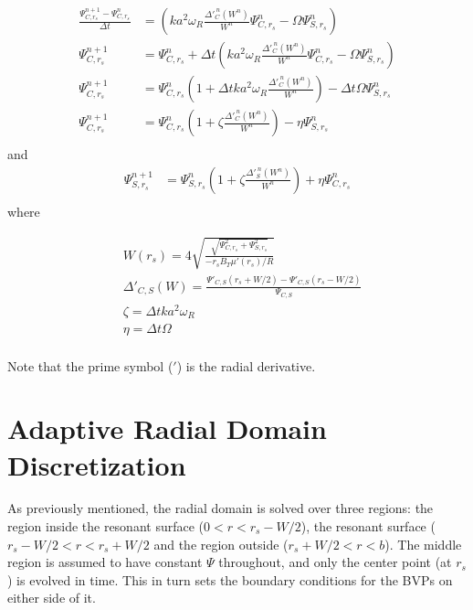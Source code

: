 \documentclass{article}
\begin{document}
\begin{equation} \label{eq3}
\begin{split}
\frac{\Psi_{C,r_s}^{n+1}-\Psi_{C,r_s}^{n}}{\Delta t} &=\left( k a^2 \omega_R \frac{\Delta'^{\ n}_{C}(W^n)}{W^n}\Psi_{C,r_s}^n-\Omega \Psi_{S,r_s}^n  \right ) \\
\Psi_{C,r_s}^{n+1} &=\Psi_{C,r_s}^{n}+\Delta t \left( k a^2 \omega_R \frac{\Delta'^{\ n}_C(W^{n})}{W^{n}}\Psi_{C,r_s}^{n}-\Omega \Psi_{S,r_s}^{n} \right )  \\ 
\Psi_{C,r_s}^{n+1} &=\Psi_{C,r_s}^{n}\left( 1 + \Delta t  k a^2 \omega_R \frac{\Delta'^{\ n}_C(W^{n})}{W^{n}}\right) - \Delta t \Omega \Psi_{S,r_s}^{n}   \\
\Psi_{C,r_s}^{n+1} &=\Psi_{C,r_s}^{n}\left( 1 + \zeta \frac{\Delta'^{\ n}_C(W^{n})}{W^{n}}\right) - \eta \Psi_{S,r_s}^{n}   \\
\end{split} 
\end{equation} 
and
\begin{equation} \label{eq3}
\begin{split}
\Psi_{S,r_s}^{n+1} &=\Psi_{S,r_s}^{n}\left( 1 + \zeta \frac{\Delta'^{\ n}_S(W^{n})}{W^{n}}\right) + \eta \Psi_{C,r_s}^{n}   \\
\end{split} 
\end{equation} 
where



\begin{equation} \label{eq3}
\begin{split}
 & W(r_s) = 4 \sqrt{\frac{\sqrt{\Psi^2_{C,r_s} + \Psi^2_{S,r_s}}}{-r_sB_T\mu'(r_s)/R} }\\
  & \Delta'_{C,S}(W)=\frac{\Psi'_{C,S}(r_s+W/2)-\Psi'_{C,S}(r_s-W/2)}{\Psi_{C,S}} \\
  & \zeta = \Delta t k a^2 \omega_R \\
  & \eta =  \Delta t \Omega \\
\end{split} 
\end{equation} 

Note that the prime symbol ($'$) is the radial derivative.  


\section{Adaptive Radial Domain Discretization}
As previously mentioned, the radial domain is solved over three regions: the region inside the resonant surface ($0<r<r_s-W/2$), the resonant surface ($r_s-W/2<r<r_s+W/2$ and the region outside ($r_s+W/2<r<b$).  The middle region is assumed to have constant $\Psi$ throughout, and only the center point (at $r_s$) is evolved in time.  This in turn sets the boundary conditions for the BVPs on either side of it.  
\end{document}
